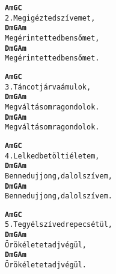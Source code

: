 \newpage
{}
\kottastart
{}
\kottaend
\begin{minipage}{\textwidth}
\begin{multicols}{2}
\begin{minipage}{\textwidth}
\begin{alltt}
\textbf{        Am      G   C}
2. Megigézted szívemet,
\textbf{        Dm        G    Am}
   Megérintetted bensőmet,
\textbf{        Dm        G    Am}
   Megérintetted bensőmet.
\end{alltt}
\vspace{0.0cm}
\versszakspacing
\end{minipage}
\begin{minipage}{\textwidth}
\begin{alltt}
\textbf{           Am   G   C}
3. Táncot járva ámulok,
\textbf{          Dm      G    Am}
   Megváltásomra gondolok.
\textbf{          Dm      G    Am}
   Megváltásomra gondolok.
\end{alltt}
\vspace{0.0cm}
\versszakspacing
\end{minipage}
\begin{minipage}{\textwidth}
\begin{alltt}
\textbf{           Am     G   C}
4. Lelked betölti életem,
\textbf{          Dm         G      Am}
   Benned ujjong, dalol szívem,
\textbf{          Dm         G      Am}
   Benned ujjong, dalol szívem.
\end{alltt}
\vspace{0.0cm}
\versszakspacing
\end{minipage}
\begin{minipage}{\textwidth}
\begin{alltt}
\textbf{            Am      G    C}
5. Tegyél szívedre pecsétül,
\textbf{        Dm     G      Am}
   Örök életet adj végül,
\textbf{        Dm     G      Am}
   Örök életet adj végül.
\end{alltt}
\vspace{0.0cm}
\versszakspacing
\end{minipage}
\vspace{0.2cm}
\end{multicols}
\end{minipage}

